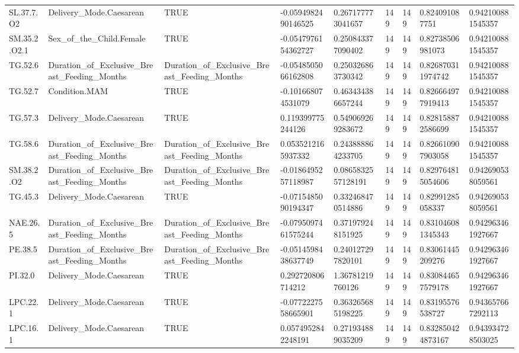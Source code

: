 \begin{longtable}{lllllllll}
SL.37.7.O2 & Delivery\_Mode.Caesarean & TRUE & -0.0594982490146525 & 0.267177773041657 & 149 & 149 & 0.824091087751 & 0.942100881545357 \\
SM.35.2.O2.1 & Sex\_of\_the\_Child.Female & TRUE & -0.0547976154362727 & 0.250843377090402 & 149 & 149 & 0.82738506981073 & 0.942100881545357 \\
TG.52.6 & Duration\_of\_Exclusive\_Breast\_Feeding\_Months & Duration\_of\_Exclusive\_Breast\_Feeding\_Months & -0.0548505066162808 & 0.250326863730342 & 149 & 149 & 0.826870311974742 & 0.942100881545357 \\
TG.52.7 & Condition.MAM & TRUE & -0.101668074531079 & 0.463434386657244 & 149 & 149 & 0.826664977919413 & 0.942100881545357 \\
TG.57.3 & Delivery\_Mode.Caesarean & TRUE & 0.119399775244126 & 0.549069269283672 & 149 & 149 & 0.828158872586699 & 0.942100881545357 \\
TG.58.6 & Duration\_of\_Exclusive\_Breast\_Feeding\_Months & Duration\_of\_Exclusive\_Breast\_Feeding\_Months & 0.0535212165937332 & 0.243888864233705 & 149 & 149 & 0.826610907903058 & 0.942100881545357 \\
SM.38.2.O2 & Duration\_of\_Exclusive\_Breast\_Feeding\_Months & Duration\_of\_Exclusive\_Breast\_Feeding\_Months & -0.0186495257118987 & 0.0865832557128191 & 149 & 149 & 0.829764815054606 & 0.942690538059561 \\
TG.45.3 & Delivery\_Mode.Caesarean & TRUE & -0.0715485090194347 & 0.332468470514886 & 149 & 149 & 0.82991285058337 & 0.942690538059561 \\
NAE.26.5 & Duration\_of\_Exclusive\_Breast\_Feeding\_Months & Duration\_of\_Exclusive\_Breast\_Feeding\_Months & -0.0795097461575244 & 0.371979248151925 & 149 & 149 & 0.831046081345343 & 0.942963461927667 \\
PE.38.5 & Duration\_of\_Exclusive\_Breast\_Feeding\_Months & Duration\_of\_Exclusive\_Breast\_Feeding\_Months & -0.0514598438637749 & 0.240127297820101 & 149 & 149 & 0.83061445209276 & 0.942963461927667 \\
PI.32.0 & Delivery\_Mode.Caesarean & TRUE & 0.292720806714212 & 1.36781219760126 & 149 & 149 & 0.830844657579178 & 0.942963461927667 \\
LPC.22.1 & Delivery\_Mode.Caesarean & TRUE & -0.0772227558665901 & 0.363265685198225 & 149 & 149 & 0.83195576538727 & 0.943657667292113 \\
LPC.16.1 & Delivery\_Mode.Caesarean & TRUE & 0.0574952842248191 & 0.271934889035209 & 149 & 149 & 0.832850424873167 & 0.943934728503025 \\

\end{longtable}
